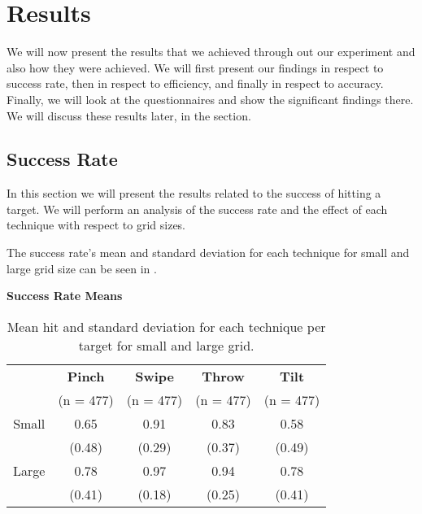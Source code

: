 \section{Results}
We will now present the results that we achieved through out our experiment and also how they were achieved. We will first present our findings in respect to success rate, then in respect to efficiency, and finally in respect to accuracy. Finally, we will look at the questionnaires and show the significant findings there. We will discuss these results later, in the  section.  

\subsection{Success Rate}
In this section we will present the results related to the success of hitting a target.
We will perform an analysis of the success rate and the effect of each technique with respect to grid sizes.

The success rate's mean and standard deviation for each technique for small and large grid size can be seen in .

\begin{table}[H]
	\centering
	\textbf{Success Rate Means}\\[4pt]
	\begin{adjustbox}{width=\columnwidth}
	\begin{tabular}{|c|c|c|c|c|}
			\hline
			\rowcolor[HTML]{9B9B9B} 
			& \textbf{Pinch} & \textbf{Swipe} & \textbf{Throw} & \textbf{Tilt} \\
			\rowcolor[HTML]{9B9B9B} 
			 & (n = 477) & (n = 477) & (n = 477) & (n = 477) \\ \hline
			Small & 0.65        & 0.91         & 0.83         & 0.58        \\
			 & (0.48)        & (0.29)         & (0.37)         & (0.49)        \\ \hline
			Large & 0.78        & 0.97         & 0.94         & 0.78        \\
			 & (0.41)        & (0.18)         & (0.25)         & (0.41)        \\ \hline
	\end{tabular}
	\end{adjustbox}
	\caption{Mean hit  and standard deviation for each technique per target for small and large grid.}
	\label{tab:meanHitTechnique}
\end{table}

